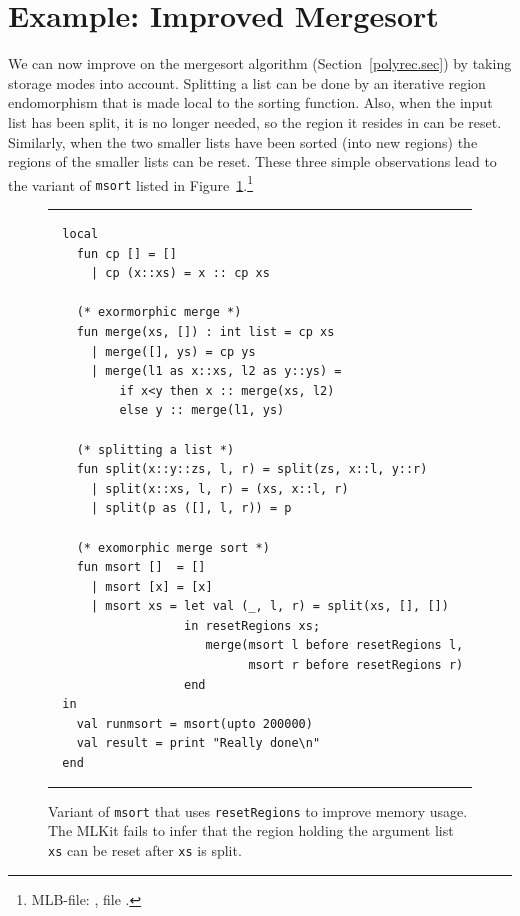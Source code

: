 \documentclass[12pt]{book}
\begin{document}
\section{Example: Improved Mergesort}
\label{improvedmerge.sec}
We can now improve on the
%
%
mergesort algorithm (Section~\ref{polyrec.sec}) by taking storage
modes into account. Splitting a list can be done by an iterative
region endomorphism that is made local to the sorting function.  Also,
when the input list has been split, it is no longer needed, so the
region it resides in can be reset. Similarly, when the two smaller
lists have been sorted (into new regions) the regions of the smaller
lists can be reset. These three simple observations lead to the
variant of {\tt msort} listed in
Figure~\ref{msortreset1.fig}.\footnote{MLB-file:
  , file
  .}
\begin{figure}
\hrule
\medskip
\begin{verbatim}
  local
    fun cp [] = []
      | cp (x::xs) = x :: cp xs

    (* exormorphic merge *)
    fun merge(xs, []) : int list = cp xs
      | merge([], ys) = cp ys
      | merge(l1 as x::xs, l2 as y::ys) =
          if x<y then x :: merge(xs, l2)
          else y :: merge(l1, ys)

    (* splitting a list *)
    fun split(x::y::zs, l, r) = split(zs, x::l, y::r)
      | split(x::xs, l, r) = (xs, x::l, r)
      | split(p as ([], l, r)) = p

    (* exomorphic merge sort *)
    fun msort []  = []
      | msort [x] = [x]
      | msort xs = let val (_, l, r) = split(xs, [], [])
                   in resetRegions xs;
                      merge(msort l before resetRegions l,
                            msort r before resetRegions r)
                   end
  in
    val runmsort = msort(upto 200000)
    val result = print "Really done\n"
  end
\end{verbatim}
\caption{Variant of {\tt msort} that uses {\tt resetRegions} to improve
  memory usage. The MLKit fails to infer that the region holding the
  argument list {\tt xs} can be reset after {\tt xs} is split.}
\label{msortreset1.fig}
\medskip \hrule
\end{figure}
\end{document}
